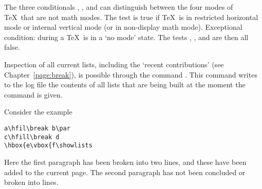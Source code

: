 \documentclass{book}
\begin{document}
The three conditionals , , and
 can distinguish between the four modes of
\TeX\ that are not math modes.
The  test is true if \TeX\ is in 
restricted horizontal mode or internal vertical mode
(or in non-display math mode).
Exceptional condition: during a  \TeX\
is in a `no mode' state. The tests ,
, and  are then all false.

Inspection of all current lists, including the `recent
contributions' (see Chapter~\ref{page:break}),
is possible through the command \label{showlists}.
This command writes to the log file the contents of all
lists that are being built at the moment the command is given.

Consider the example
\begin{verbatim}
a\hfil\break b\par 
c\hfill\break d
\hbox{e\vbox{f\showlists
\end{verbatim}
Here the first paragraph has been broken into two lines, and
these have been added to the current page. The second paragraph
has not been concluded or broken into lines.
\end{document}

